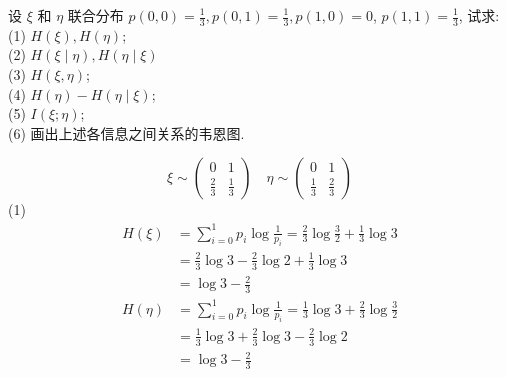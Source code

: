  \begin{exercise}
 设 $ \xi $ 和 $ \eta $ 联合分布 $ p(0,0)=\frac{1}{3}, p(0,1)=\frac{1}{3}, p(1,0)=0 $, $ p(1,1)=\frac{1}{3} $, 试求:\\
(1) $ H(\xi), H(\eta) $;\\
(2) $ H(\xi \mid \eta), H(\eta \mid \xi) $\\
(3) $ H(\xi, \eta) $;\\
(4) $ H(\eta)-H(\eta \mid \xi) $;\\
(5) $ I(\xi ; \eta) $;\\
(6) 画出上述各信息之间关系的韦恩图.

 \end{exercise}
 \begin{solution}
 \begin{table}[h]
     \centering
 \end{table}
$$
\xi \sim\left(\begin{array}{cc}
0 & 1 \\
\frac{2}{3} & \frac{1}{3}
\end{array}\right) \quad \eta \sim\left(\begin{array}{cc}
0 & 1 \\
\frac{1}{3} & \frac{2}{3}
\end{array}\right)
$$
(1)
$$
\begin{aligned}
H(\xi) & =\sum_{i=0}^{1} p_{i} \log \frac{1}{p_{i}}=\frac{2}{3} \log \frac{3}{2}+\frac{1}{3} \log 3 \\
& =\frac{2}{3} \log 3-\frac{2}{3} \log 2+\frac{1}{3} \log 3 \\
& =\log 3-\frac{2}{3}
\end{aligned}
$$
$$
\begin{aligned}
H(\eta) & =\sum_{i=0}^{1} p_{i} \log \frac{1}{p_{i}}=\frac{1}{3} \log 3+\frac{2}{3} \log \frac{3}{2} \\
& =\frac{1}{3} \log 3+\frac{2}{3} \log 3-\frac{2}{3} \log 2 \\
& =\log 3-\frac{2}{3}
\end{aligned}
$$
\end{solution}
